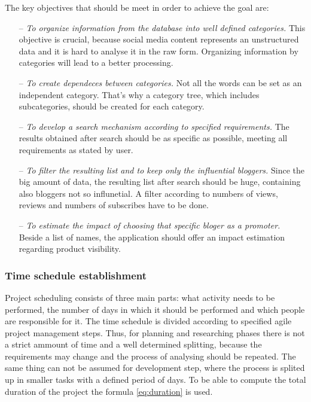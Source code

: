 The key objectives that should be meet in order to achieve the goal are:

\begin{itemize}

\item[--] \textit{To organize information from the database into well defined categories.} This objective is crucial, because social media content represents an unstructured data and it is hard to analyse it in the raw form. Organizing information by categories will lead to a better processing.

\item[--] \textit{To create dependeces between categories.} Not all the words can be set as an independent category. That's why a category tree, which includes subcategories, should be created for each category.

\item[--] \textit{To develop a search mechanism according to specified requirements.} The results obtained after search should be as specific as possible, meeting all requirements as stated by user.

\item[--] \textit{To filter the resulting list and to keep only the influential bloggers.} Since the big amount of data, the resulting list after search should be huge, containing also bloggers not so influnetial. A filter according to numbers of views, reviews and numbers of subscribes have to be done.

\item[--] \textit{To estimate the impact of choosing that specific bloger as a promoter.} Beside a list of names, the application should offer an impact estimation regarding product visibility.

\end{itemize}

\subsubsection{Time schedule establishment}

Project scheduling consists of three main parts: what activity needs to be performed, the number of days in which it should be performed and which people are responsible for it. The time schedule is divided according to specified agile project management steps. Thus, for planning and researching phases there is not a strict ammount of time and a well determined splitting, because the requirements may change and the process of analysing should be repeated. The same thing can not be assumed for development step, where the process is splited up in smaller tasks with a defined period of days. To be able to compute the total duration of the project the formula \eqref{eq:duration} is used.

